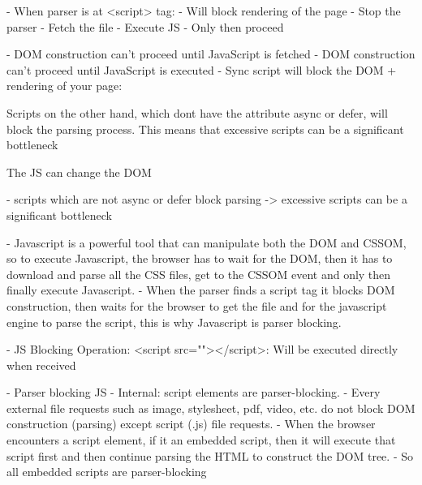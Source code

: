 - When parser is at <script> tag:
	- Will block rendering of the page
	- Stop the parser
	- Fetch the file
	- Execute JS
	- Only then proceed

- DOM construction can't proceed until JavaScript is fetched
- DOM construction can't proceed until JavaScript is executed
- Sync script will block the DOM + rendering of your page:


Scripts on the other hand, which dont have the attribute async or defer, will block the parsing process.
This means that excessive scripts can be a significant bottleneck %

The JS can change the DOM %

- scripts which are not async or defer block parsing -> excessive scripts can be a significant bottleneck


- Javascript is a powerful tool that can manipulate both the DOM and CSSOM, so to execute Javascript, the browser has to wait for the DOM, then it has to download and parse all the CSS files, get to the CSSOM event and only then finally execute Javascript.
- When the parser finds a script tag it blocks DOM construction, then waits for the browser to get the file and for the javascript engine to parse the script, this is why Javascript is parser blocking.

- JS Blocking Operation: <script src=""></script>: Will be executed directly when received


- Parser blocking JS
- Internal: script elements are parser-blocking. 
- Every external file requests such as image, stylesheet, pdf, video, etc. do not block DOM construction (parsing) except script (.js) file requests.
- When the browser encounters a script element, if it an embedded script, then it will execute that script first and then continue parsing the HTML to construct the DOM tree. 
- So all embedded scripts are parser-blocking

